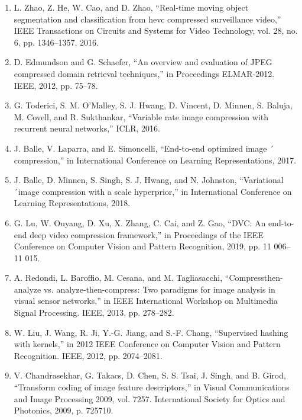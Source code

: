 \documentclass{article}
\begin{document}
\begin{enumerate}
	\item L. Zhao, Z. He, W. Cao, and D. Zhao, “Real-time moving object segmentation and classification from hevc compressed surveillance video,” IEEE
	Transactions on Circuits and Systems for Video Technology, vol. 28,
	no. 6, pp. 1346–1357, 2016.

	\item D. Edmundson and G. Schaefer, “An overview and evaluation of JPEG
	compressed domain retrieval techniques,” in Proceedings ELMAR-2012.
	IEEE, 2012, pp. 75–78.

	\item G. Toderici, S. M. O’Malley, S. J. Hwang, D. Vincent, D. Minnen,
	S. Baluja, M. Covell, and R. Sukthankar, “Variable rate image compression with recurrent neural networks,” ICLR, 2016.

	\item J. Balle, V. Laparra, and E. Simoncelli, “End-to-end optimized image ´
	compression,” in International Conference on Learning Representations,
	2017.

	\item J. Balle, D. Minnen, S. Singh, S. J. Hwang, and N. Johnston, “Variational ´image compression with a scale hyperprior,” in International Conference
	on Learning Representations, 2018.

	\item G. Lu, W. Ouyang, D. Xu, X. Zhang, C. Cai, and Z. Gao, “DVC: An
	end-to-end deep video compression framework,” in Proceedings of the
	IEEE Conference on Computer Vision and Pattern Recognition, 2019,
	pp. 11 006–11 015.

	\item A. Redondi, L. Baroffio, M. Cesana, and M. Tagliasacchi, “Compressthen-analyze vs. analyze-then-compress: Two paradigms for image analysis in visual sensor networks,” in IEEE International Workshop on
	Multimedia Signal Processing. IEEE, 2013, pp. 278–282.

	\item W. Liu, J. Wang, R. Ji, Y.-G. Jiang, and S.-F. Chang, “Supervised
	hashing with kernels,” in 2012 IEEE Conference on Computer Vision
	and Pattern Recognition. IEEE, 2012, pp. 2074–2081.

	\item V. Chandrasekhar, G. Takacs, D. Chen, S. S. Tsai, J. Singh, and
	B. Girod, “Transform coding of image feature descriptors,” in Visual
	Communications and Image Processing 2009, vol. 7257. International
	Society for Optics and Photonics, 2009, p. 725710.


\end{enumerate}
\end{document}
